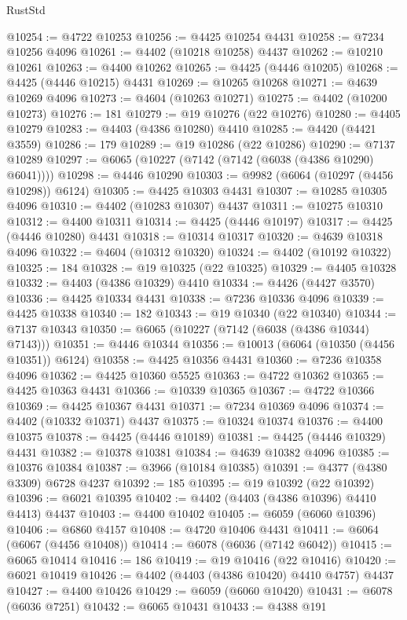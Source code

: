 \begin{lexlean}{RustStd}
\begin{coremodule}
@10254 := @4722 @10253
@10256 := @4425 @10254 @4431
@10258 := @7234 @10256 @4096
@10261 := @4402 (@10218 @10258) @4437
@10262 := @10210 @10261
@10263 := @4400 @10262
@10265 := @4425 (@4446 @10205)
@10268 := @4425 (@4446 @10215) @4431
@10269 := @10265 @10268
@10271 := @4639 @10269 @4096
@10273 := @4604 (@10263 @10271)
@10275 := @4402 (@10200 @10273)
@10276 := 181
@10279 := @19 @10276 (@22 @10276)
@10280 := @4405 @10279
@10283 := @4403 (@4386 @10280) @4410
@10285 := @4420 (@4421 @3559)
@10286 := 179
@10289 := @19 @10286 (@22 @10286)
@10290 := @7137 @10289
@10297 := @6065 (@10227 (@7142 (@7142 (@6038 (@4386 @10290) @6041))))
@10298 := @4446 @10290
@10303 := @9982 (@6064 (@10297 (@4456 @10298)) @6124)
@10305 := @4425 @10303 @4431
@10307 := @10285 @10305 @4096
@10310 := @4402 (@10283 @10307) @4437
@10311 := @10275 @10310
@10312 := @4400 @10311
@10314 := @4425 (@4446 @10197)
@10317 := @4425 (@4446 @10280) @4431
@10318 := @10314 @10317
@10320 := @4639 @10318 @4096
@10322 := @4604 (@10312 @10320)
@10324 := @4402 (@10192 @10322)
@10325 := 184
@10328 := @19 @10325 (@22 @10325)
@10329 := @4405 @10328
@10332 := @4403 (@4386 @10329) @4410
@10334 := @4426 (@4427 @3570)
@10336 := @4425 @10334 @4431
@10338 := @7236 @10336 @4096
@10339 := @4425 @10338
@10340 := 182
@10343 := @19 @10340 (@22 @10340)
@10344 := @7137 @10343
@10350 := @6065 (@10227 (@7142 (@6038 (@4386 @10344) @7143)))
@10351 := @4446 @10344
@10356 := @10013 (@6064 (@10350 (@4456 @10351)) @6124)
@10358 := @4425 @10356 @4431
@10360 := @7236 @10358 @4096
@10362 := @4425 @10360 @5525
@10363 := @4722 @10362
@10365 := @4425 @10363 @4431
@10366 := @10339 @10365
@10367 := @4722 @10366
@10369 := @4425 @10367 @4431
@10371 := @7234 @10369 @4096
@10374 := @4402 (@10332 @10371) @4437
@10375 := @10324 @10374
@10376 := @4400 @10375
@10378 := @4425 (@4446 @10189)
@10381 := @4425 (@4446 @10329) @4431
@10382 := @10378 @10381
@10384 := @4639 @10382 @4096
@10385 := @10376 @10384
@10387 := @3966 (@10184 @10385)
@10391 := @4377 (@4380 @3309) @6728 @4237
@10392 := 185
@10395 := @19 @10392 (@22 @10392)
@10396 := @6021 @10395
@10402 := @4402 (@4403 (@4386 @10396) @4410 @4413) @4437
@10403 := @4400 @10402
@10405 := @6059 (@6060 @10396)
@10406 := @6860 @4157
@10408 := @4720 @10406 @4431
@10411 := @6064 (@6067 (@4456 @10408))
@10414 := @6078 (@6036 (@7142 @6042))
@10415 := @6065 @10414
@10416 := 186
@10419 := @19 @10416 (@22 @10416)
@10420 := @6021 @10419
@10426 := @4402 (@4403 (@4386 @10420) @4410 @4757) @4437
@10427 := @4400 @10426
@10429 := @6059 (@6060 @10420)
@10431 := @6078 (@6036 @7251)
@10432 := @6065 @10431
@10433 := @4388 @191

\end{coremodule}
\end{lexlean}
